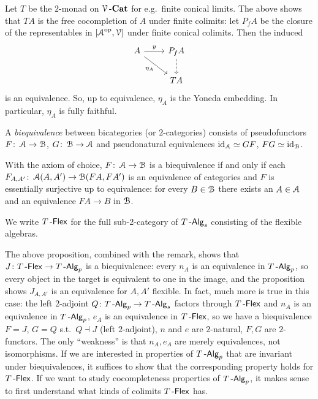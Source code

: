 \documentclass[a4paper,11pt,oneside,openany]{scrbook}
\begin{document}
\begin{rmk}
Let $T$ be the $2$-monad on $\operatorname{\mathcal{V}}\mbox{-}{\normalfont\textbf{Cat}}$ for e.g.\ finite conical limits. The above shows that $TA$ is the free cocompletion of $A$ under finite colimits: let $P_f A$ be the closure of the representables in $[\operatorname{\mathcal{A}}^{\operatorname{\text{op}}},\operatorname{\mathcal{V}}]$ under finite conical colimits. Then the induced
\[\begin{tikzcd}
A \arrow[r, "y"] \arrow[rd, "\eta_A"'] & P_fA \arrow[d, dashed] \\
                                       & TA                    
\end{tikzcd}\]
is an equivalence. So, up to equivalence, $\eta_A$ is the Yoneda embedding. In particular, $\eta_A$ is fully faithful.
\end{rmk}
\begin{defn} A \emph{biequivalence} between bicategories (or $2$-categories) consists of pseudofunctors $F\colon\operatorname{\mathcal{A}}\to\operatorname{\mathcal{B}}$, $G\colon\operatorname{\mathcal{B}}\to\operatorname{\mathcal{A}}$ and pseudonatural equivalences $\operatorname{id}_{\operatorname{\mathcal{A}}}\simeq GF$, $FG\simeq\operatorname{id}_{\operatorname{\mathcal{B}}}$.
\end{defn}
\begin{rmk}
With the axiom of choice, $F\colon\operatorname{\mathcal{A}}\to\operatorname{\mathcal{B}}$ is a biequivalence if and only if each $F_{A,A'}\colon\operatorname{\mathcal{A}}(A,A')\to\operatorname{\mathcal{B}}(FA,FA')$ is an equivalence of categories and $F$ is essentially surjective up to equivalence: for every $B\in\operatorname{\mathcal{B}}$ there exists an $A\in\operatorname{\mathcal{A}}$ and an equivalence $FA\to B$ in $\operatorname{\mathcal{B}}$. 
\end{rmk}
We write $T\operatorname{-\mathsf{Flex}}$ for the full sub-2-category of $T\operatorname{-\mathsf{Alg}}_s$ consisting of the flexible algebras. 

The above proposition, combined with the remark, shows that $J\colon T\operatorname{-\mathsf{Flex}}\to T\operatorname{-\mathsf{Alg}}_p$ is a biequivalence: every $n_A$ is an equivalence in $T\operatorname{-\mathsf{Alg}}_p$, so every object in the target is equivalent to one in the image, and the proposition shows $J_{A,A'}$ is an equivalence for $A,A'$ flexible. In fact, much more is true in this case: the left $2$-adjoint $Q\colon T\operatorname{-\mathsf{Alg}}_p\to T\operatorname{-\mathsf{Alg}}_s$ factors through $T\operatorname{-\mathsf{Flex}}$ and $n_A$ is an equivalence in $T\operatorname{-\mathsf{Alg}}_p$, $e_A$ is an equivalence in $T\operatorname{-\mathsf{Flex}}$, so we have a biequivalence $F=J$, $G=Q$ s.t.\ $Q\dashv J$ (left $2$-adjoint), $n$ and $e$ are $2$-natural, $F, G$ are $2$-functors. The only ``weakness'' is that $n_A, e_A$ are merely equivalences, not isomorphisms. If we are interested in properties of $T\operatorname{-\mathsf{Alg}}_p$ that are invariant under biequivalences, it suffices to show that the corresponding property holds for $T\operatorname{-\mathsf{Flex}}$. If we want to study cocompleteness properties of $T\operatorname{-\mathsf{Alg}}_p$, it makes sense to first understand what kinds of colimits $T\operatorname{-\mathsf{Flex}}$ has. 
\end{document}
